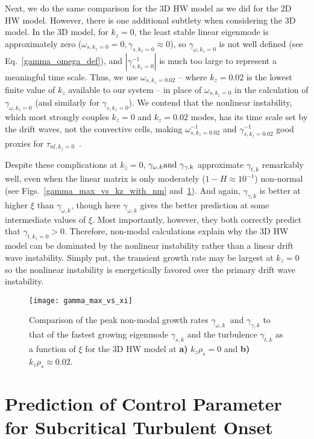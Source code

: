 \documentclass[twocolumn,showkeys,superscriptaddress]{revtex4}
\begin{document}
Next, we do the same comparison for the 3D HW model as we did for the 2D HW model. However, there is one additional subtlety when considering the 3D model. In the 3D model, for $k_z=0$, the least stable linear
eigenmode is approximately zero ($\omega_{s,k_z=0} = 0, \gamma_{s,k_z=0} \approx 0$), so $\gamma_{\omega,k_z=0}$ is not well defined (see Eq.~\ref{gamma_omega_def}), and $|\gamma_{s,k_z=0}^{-1}|$ is much too large to
represent a meaningful time scale. 
Thus, we use $\omega_{s,k_z=0.02}$ -- where $k_z=0.02$ is the lowest finite value of $k_z$ available to our system -- in place of
$\omega_{s,k_z=0}$ in the calculation of $\gamma_{\omega,k_z=0}$ (and similarly for $\gamma_{s,k_z=0}$). 
We contend that the nonlinear instability, which most strongly couples $k_z=0$ and $k_z=0.02$ modes, has its time scale set
by the drift waves, not the convective cells, making $\omega_{s,k_z=0.02}^{-1}$ and $\gamma_{s,k_z=0.02}^{-1}$ good proxies for $\tau_{nl,k_z=0}$~\cite{friedman2014}. 

Despite these complications at $k_z=0$,  $\gamma_{\omega,k} \rm{and} \ \gamma_{\gamma,k}$ approximate $\gamma_{t,k}$ remarkably well, even when the linear matrix is only moderately ($1-H \approx 10^{-1}$) non-normal
(see Figs.~\ref{gamma_max_vs_kz_with_nm} and~\ref{gamma_max_vs_xi}). And again, $\gamma_{\gamma,k}$ is better at higher $\xi$ than $\gamma_{\omega,k}$, though here $\gamma_{\omega,k}$ gives the better prediction
at some intermediate values of $\xi$. Most importantly, however, they both correctly predict that $\gamma_{t,k_z=0} > 0$.
Therefore, non-modal calculations explain why the 3D HW model can be dominated by the nonlinear instability rather than a linear drift wave instability. 
Simply put, the transient growth rate may be largest at $k_z=0$ so the nonlinear instability is energetically favored over the primary drift wave instability.

\begin{figure}
\centerline{\texttt{[image: gamma\_max\_vs\_xi]}}
\caption{Comparison of the peak non-modal growth rates $\gamma_{\omega,k} \ $ and $\gamma_{\gamma,k}$ to that of the fastest growing eigenmode $\gamma_{s,k}$ 
and the turbulence $\gamma_{t,k}$ as a function of $\xi$ for the 3D HW model at {\bf a)} $k_z \rho_s = 0$ and {\bf b)} $k_z \rho_s \approx 0.02$. }
\label{gamma_max_vs_xi}
\end{figure}

\section{Prediction of Control Parameter for Subcritical Turbulent Onset}
\label{sec_subcrit_prediction}
\end{document}

